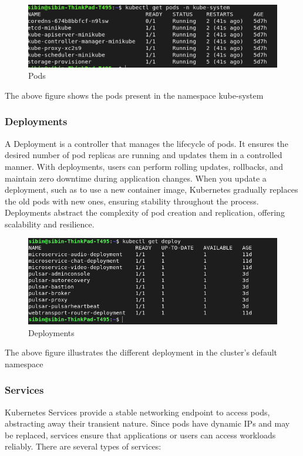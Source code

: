 \begin{figure}[H]
\caption{Pods}
\centering
\includegraphics[width=1\textwidth]{SOA/k8s-components.png}
\end{figure}

The above figure shows the pods present in the namespace kube-system

\subsubsection{Deployments}
A Deployment is a controller that manages the lifecycle of pods. It ensures the desired number of pod replicas are running and updates them in a controlled manner. With deployments, users can perform rolling updates, rollbacks, and maintain zero downtime during application changes. When you update a deployment, such as to use a new container image, Kubernetes gradually replaces the old pods with new ones, ensuring stability throughout the process. Deployments abstract the complexity of pod creation and replication, offering scalability and resilience.

\begin{figure}[H]
\caption{Deployments}
\centering
\includegraphics[width=1\textwidth]{SOA/k_deploy.png}
\end{figure}
The above figure illustrates the different deployment in the cluster's default namespace

\subsubsection{Services}
Kubernetes Services provide a stable networking endpoint to access pods, abstracting away their transient nature. Since pods have dynamic IPs and may be replaced, services ensure that applications or users can access workloads reliably. There are several types of services:

